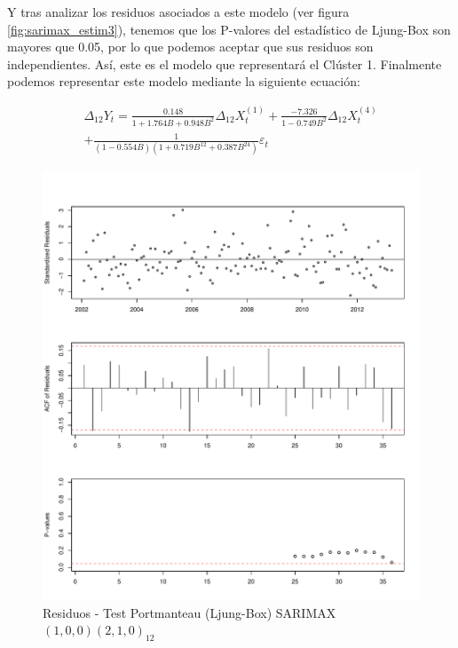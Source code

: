 \documentclass[12pt,oneside]{book}\usepackage[]{graphicx}\usepackage[]{color}
\makeatletter
\def\maxwidth{ %
  \ifdim\Gin@nat@width>\linewidth
    \linewidth
  \else
    \Gin@nat@width
  \fi
}
\newenvironment{knitrout}{}{} %
\theoremstyle{definition} %
\makeatother
\begin{document}
Y tras analizar los residuos asociados a este modelo (ver figura \ref{fig:sarimax_estim3}), tenemos que los P-valores del estadístico de Ljung-Box son mayores que 0.05, por lo que podemos aceptar que sus residuos son independientes. Así, este es el modelo que representará el Clúster 1. Finalmente podemos representar este modelo mediante la siguiente ecuación:


\begin{eqnarray} \label{eq:sarimax}
\Delta_{12} Y_t = \frac{0.148 }{1+ 1.764B + 0.948B^2} \Delta_{12} X^{(1)}_t + \frac{-7.326 }{1 - 0.749B^2} \Delta_{12} X^{(4)}_t     \nonumber\\
+ \frac{1}{( 1 - 0.554 B )(1+ 0.719 B^{12} +0.387 B^{24} )  }\varepsilon_t                  \label{prime}
\end{eqnarray}


\begin{knitrout}
\color{fgcolor}\begin{figure}[h]

{\centering \includegraphics[width=\maxwidth]{figure/unnamed-chunk-56-1} 

}

\caption{\label{fig:sarimax_estim3} Residuos - Test Portmanteau (Ljung-Box) SARIMAX $(1,0,0)(2,1,0)_{12}$}\label{fig:unnamed-chunk-56}
\end{figure}


\end{knitrout}
\end{document}
